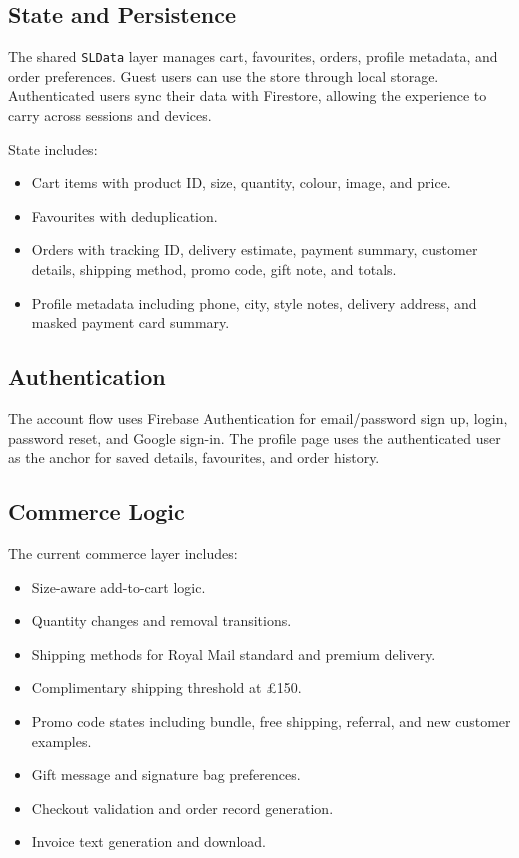 \documentclass[11pt,a4paper]{article}
\begin{document}
\subsection{State and Persistence}

The shared \texttt{SLData} layer manages cart, favourites, orders, profile metadata, and order preferences. Guest users can use the store through local storage. Authenticated users sync their data with Firestore, allowing the experience to carry across sessions and devices.

State includes:

\begin{itemize}
    \item Cart items with product ID, size, quantity, colour, image, and price.
    \item Favourites with deduplication.
    \item Orders with tracking ID, delivery estimate, payment summary, customer details, shipping method, promo code, gift note, and totals.
    \item Profile metadata including phone, city, style notes, delivery address, and masked payment card summary.
\end{itemize}

\subsection{Authentication}

The account flow uses Firebase Authentication for email/password sign up, login, password reset, and Google sign-in. The profile page uses the authenticated user as the anchor for saved details, favourites, and order history.

\subsection{Commerce Logic}

The current commerce layer includes:

\begin{itemize}
    \item Size-aware add-to-cart logic.
    \item Quantity changes and removal transitions.
    \item Shipping methods for Royal Mail standard and premium delivery.
    \item Complimentary shipping threshold at \pounds150.
    \item Promo code states including bundle, free shipping, referral, and new customer examples.
    \item Gift message and signature bag preferences.
    \item Checkout validation and order record generation.
    \item Invoice text generation and download.
\end{itemize}
\end{document}
